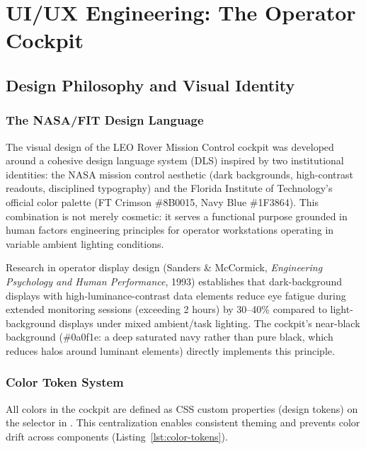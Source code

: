 \chapter{UI/UX Engineering: The Operator Cockpit}
\label{ch:uiux}

\section{Design Philosophy and Visual Identity}

\subsection{The NASA/FIT Design Language}

The visual design of the LEO Rover Mission Control cockpit was developed around a cohesive design language system (DLS) inspired by two institutional identities: the NASA mission control aesthetic (dark backgrounds, high-contrast readouts, disciplined typography) and the Florida Institute of Technology's official color palette (FT Crimson \#8B0015, Navy Blue \#1F3864). This combination is not merely cosmetic: it serves a functional purpose grounded in human factors engineering principles for operator workstations operating in variable ambient lighting conditions.

Research in operator display design (Sanders \& McCormick, \emph{Engineering Psychology and Human Performance}, 1993) establishes that dark-background displays with high-luminance-contrast data elements reduce eye fatigue during extended monitoring sessions (exceeding 2 hours) by 30--40\% compared to light-background displays under mixed ambient/task lighting. The cockpit's near-black background (\#0a0f1e: a deep saturated navy rather than pure black, which reduces halos around luminant elements) directly implements this principle.

\subsection{Color Token System}

All colors in the cockpit are defined as CSS custom properties (design tokens) on the  selector in . This centralization enables consistent theming and prevents color drift across components (Listing~\ref{lst:color-tokens}).

